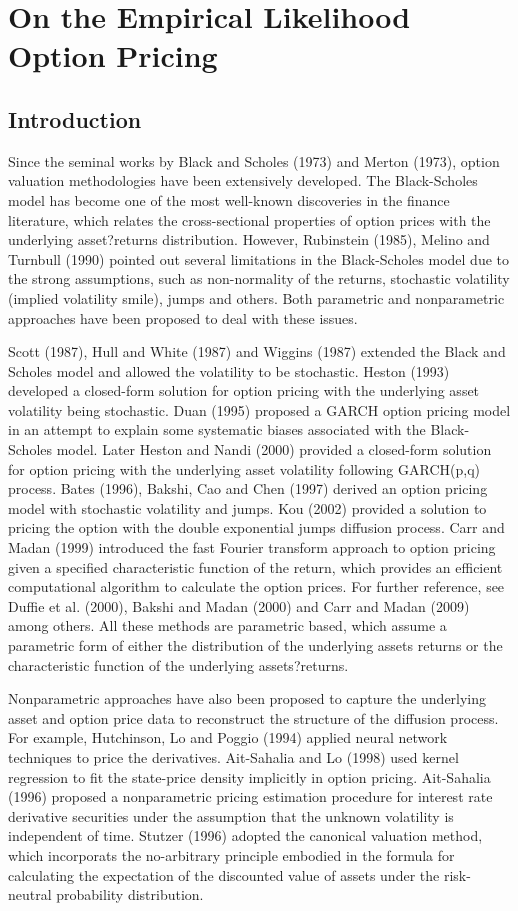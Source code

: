\chapter{On the Empirical Likelihood Option Pricing}
\section{Introduction}
Since the seminal works by Black and Scholes (1973) and Merton (1973), option valuation methodologies have been extensively developed. The Black-Scholes model has become one of the most well-known discoveries in the finance literature, which relates the cross-sectional properties of option prices with the underlying asset?returns distribution. However, Rubinstein (1985), Melino and Turnbull (1990) pointed out several limitations in the Black-Scholes model due to the strong assumptions, such as non-normality of the returns, stochastic volatility (implied volatility smile), jumps and others. Both parametric and nonparametric approaches have been proposed to deal with these issues.  

Scott (1987), Hull and White (1987) and Wiggins (1987) extended the Black and Scholes model and allowed the volatility to be stochastic. Heston (1993) developed a closed-form solution for option pricing with the underlying asset volatility being stochastic. Duan (1995) proposed a GARCH option pricing model in an attempt to explain some systematic biases associated with the Black-Scholes model. Later Heston and Nandi (2000) provided a closed-form solution for option pricing with the underlying asset volatility following GARCH(p,q) process. Bates (1996), Bakshi, Cao and Chen (1997) derived an option pricing model with stochastic volatility and jumps. Kou (2002) provided a solution to pricing the option with the double exponential jumps diffusion process. Carr and Madan (1999) introduced the fast Fourier transform approach to option pricing given a specified characteristic function of the return, which provides an efficient computational algorithm to calculate the option prices. For further reference, see Duffie et al. (2000), Bakshi and Madan (2000) and Carr and Madan (2009) among others. All these methods are parametric based, which assume a parametric form of either the distribution of the underlying assets returns or the characteristic function of the underlying assets?returns. 

Nonparametric approaches have also been proposed to capture the underlying asset and option price data to reconstruct the structure of the diffusion process. For example, Hutchinson, Lo and Poggio (1994) applied  neural network techniques to price the derivatives. Ait-Sahalia and Lo (1998) used kernel regression to fit the state-price density implicitly in option pricing. Ait-Sahalia (1996) proposed a nonparametric pricing estimation procedure for interest rate derivative securities under the assumption that the unknown volatility is independent of time. Stutzer (1996) adopted the canonical valuation method, which incorporats the no-arbitrary principle embodied in the formula for calculating the expectation of the discounted value of assets under the risk-neutral probability distribution. 

